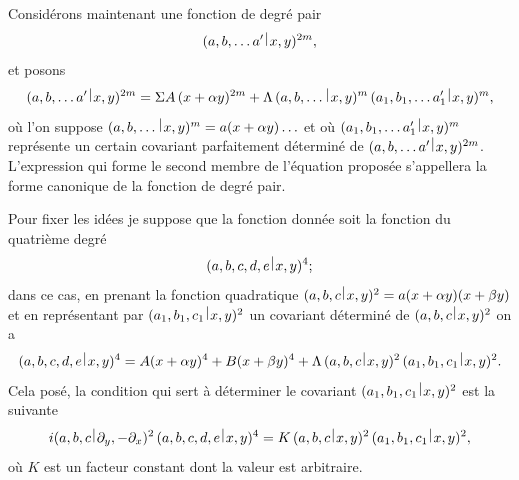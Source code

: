 \documentclass[11pt,a4paper]{book}
\theoremstyle{plain}
\newcommand{\wrule}{\hspace{-0.1em}\mid\hspace{-0.1em}}
\begin{document}
Consid\'{e}rons maintenant une fonction de degr\'{e} pair
\[
(a,b,\ldots a'\,\raisebox{0.5ex}{$\wrule$}\,x,y)^{2m},
\]
et posons
\[
(a,b,\ldots a'\,\raisebox{0.5ex}{$\wrule$}\,x,y)^{2m}=\Sigma A\,(x+\alpha y)^{2m}+\Lambda\,(a,b,\ldots\,\raisebox{0.5ex}{$\wrule$}\,x,y)^m\,(a_1,b_1,\ldots a_1'\,\raisebox{0.5ex}{$\wrule$}\,x,y)^m,
\]
o\`{u} l'on suppose $(a,b,\ldots\,\raisebox{0.5ex}{$\wrule$}\,x,y)^m=a(x+\alpha y)\ldots$ et o\`{u} $(a_1,b_1,\ldots a_1'\,\raisebox{0.5ex}{$\wrule$}\,x,y)^m$ repr\'{e}sente un certain covariant parfaitement d\'{e}termin\'{e} de $(a,b,\ldots a'\,\raisebox{0.5ex}{$\wrule$}\,x,y)^{2m}$. L'expression qui forme le second membre de l'\'{e}quation propos\'{e}e s'appellera la forme canonique de la fonction de degr\'{e} pair.

Pour fixer les id\'{e}es je suppose que la fonction donn\'{e}e soit la fonction du quatri\`{e}me degr\'{e}
\[
(a,b,c,d,e\,\raisebox{0.5ex}{$\wrule$}\,x,y)^4;
\]
dans ce cas, en prenant la fonction quadratique $(a,b,c\,\raisebox{0.5ex}{$\wrule$}\,x,y)^2=a(x+\alpha y)(x+\beta y)$ et en repr\'{e}sentant par $(a_1,b_1,c_1\,\raisebox{0.5ex}{$\wrule$}\,x,y)^2$ un covariant d\'{e}termin\'{e} de $(a,b,c\,\raisebox{0.5ex}{$\wrule$}\,x,y)^2$ on a
\[
(a,b,c,d,e\,\raisebox{0.5ex}{$\wrule$}\,x,y)^4=A(x+\alpha y)^4+B(x+\beta y)^4+\Lambda\,(a,b,c\,\raisebox{0.5ex}{$\wrule$}\,x,y)^2\,(a_1,b_1,c_1\,\raisebox{0.5ex}{$\wrule$}\,x,y)^2.
\]
Cela pos\'{e}, la condition qui sert \`{a} d\'{e}terminer le covariant $(a_1,b_1,c_1\,\raisebox{0.5ex}{$\wrule$}\,x,y)^2$ est la suivante
\[
i(a,b,c\,\raisebox{0.5ex}{$\wrule$}\,\partial_y,-\partial_x)^2\,(a,b,c,d,e\,\raisebox{0.5ex}{$\wrule$}\,x,y)^4=K\,(a,b,c\,\raisebox{0.5ex}{$\wrule$}\,x,y)^2\,(a_1,b_1,c_1\,\raisebox{0.5ex}{$\wrule$}\,x,y)^2,
\]
o\`{u} $K$ est un facteur constant dont la valeur est arbitraire.
\end{document}
